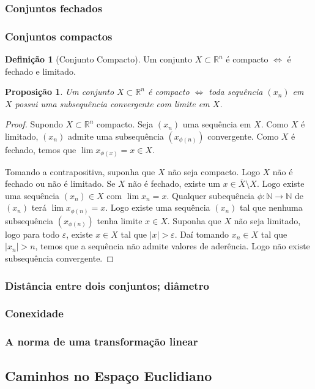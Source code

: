 \documentclass{article}
\theoremstyle{plain}
\newtheorem{prop}{Proposição}[section]
\theoremstyle{definition}
\newtheorem{definicao}{Definição}[section]
\theoremstyle{remark}
\begin{document}
   \subsubsection{ Conjuntos fechados}
   \subsubsection{ Conjuntos compactos}
\begin{definicao}[Conjunto Compacto]
	Um conjunto $X\subset \mathbb{R}^n$ é compacto $\iff $ é fechado e limitado.
\end{definicao}
\begin{prop}
	Um conjunto $X\subset \mathbb{R}^n$ é compacto $\iff$ toda sequência $(x_n)$  em $X$ possui uma subsequência convergente com limite em $X$.
\end{prop}
\begin{proof}
	Supondo $X\subset\mathbb{R}^n$ compacto. Seja $(x_n)$ uma sequência em $X$. Como $X$ é limitado, $(x_n)$ admite uma subsequência $(x_{\phi(n)})$ convergente. Como $X$ é fechado, temos que $\lim x_{\phi(x)}= x\in X$.

	Tomando a contrapositiva, suponha que $X$ não seja compacto. Logo $X$ não é fechado ou não é limitado. Se $X$ não é fechado, existe um $x\in \overline{X} \setminus X$. Logo existe uma sequência $(x_n)\in X$ com $\lim x_n = x$. Qualquer subequência $\phi:\mathbb{N}\to \mathbb{N}$  de $(x_n)$ terá $\lim x_{\phi(n)} = x$. Logo existe uma sequência $(x_n)$ tal que nenhuma subsequência $(x_{\phi(n)})$ tenha limite $x\in X$.
	Suponha que $X$ não seja limitado, logo para todo $\varepsilon$, existe $x\in X$ tal que $|x| > \varepsilon$. Daí tomando $x_n\in X$ tal que $|x_n| > n$, temos que a sequência não admite valores de aderência. Logo não existe subsequência convergente.

\end{proof}
   \subsubsection{ Distância entre dois conjuntos; diâmetro}
   \subsubsection{ Conexidade}
   \subsubsection{ A norma de uma transformação linear}
\subsection{ Caminhos no Espaço Euclidiano}
\end{document}
